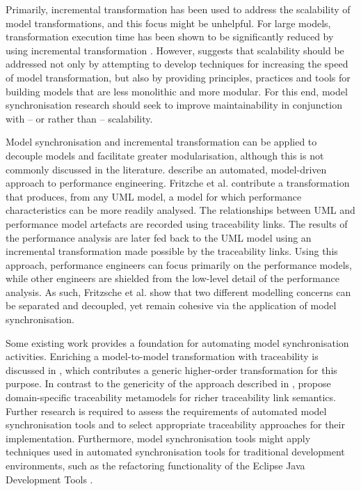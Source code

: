 Primarily, incremental transformation has been used to address the scalability of model transformations, and this focus might be unhelpful. For large models, transformation execution time has been shown to be significantly reduced by using incremental transformation \cite{hearnden06incremental}. However, \cite{kolovos08scalability} suggests that scalability should be addressed not only by attempting to develop techniques for increasing the speed of model transformation, but also by providing principles, practices and tools for building models that are less monolithic and more modular. For this end, model synchronisation research should seek to improve maintainability in conjunction with -- or rather than -- scalability.

Model synchronisation and incremental transformation can be applied to decouple models and facilitate greater modularisation, although this is not commonly discussed in the literature. \cite{fritzsche08tracing} describe an automated, model-driven approach to performance engineering. Fritzche et al. contribute a transformation that produces, from any UML model, a model for which performance characteristics can be more readily analysed. The relationships between UML and performance model artefacts are recorded using traceability links. The results of the performance analysis are later fed back to the UML model using an incremental transformation made possible by the traceability links. Using this approach, performance engineers can focus primarily on the performance models, while other engineers are shielded from the low-level detail of the performance analysis. As such, Fritzsche et al. show that two different modelling concerns can be separated and decoupled, yet remain cohesive via the application of model synchronisation.

Some existing work provides a foundation for automating model synchronisation activities. Enriching a model-to-model transformation with traceability is discussed in \cite{jouault05loosely}, which contributes a generic higher-order transformation for this purpose. In contrast to the genericity of the approach described in \cite{jouault05loosely}, \cite{drivalos08rigorously} propose domain-specific traceability metamodels for richer traceability link semantics. Further research is required to assess the requirements of automated model synchronisation tools and to select appropriate traceability approaches for their implementation. Furthermore, model synchronisation tools might apply techniques used in automated synchronisation tools for traditional development environments, such as the refactoring functionality of the Eclipse Java Development Tools \cite{fuhrer07refactoring}.

